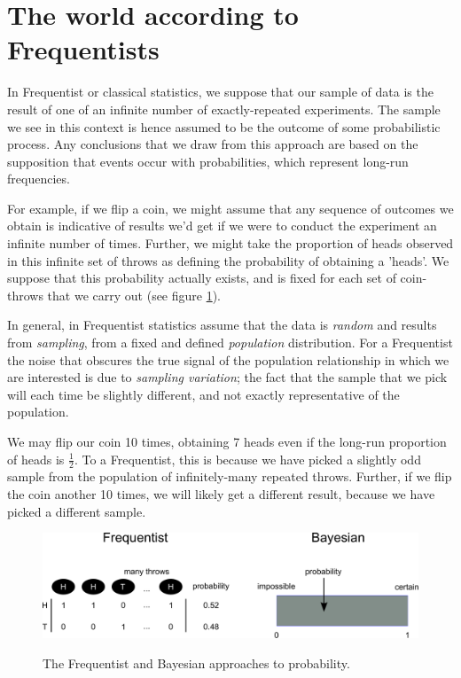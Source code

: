 \documentclass[11pt,fullpage]{book}
\begin{document}
\section{The world according to Frequentists}\label{sec:Intro_FrequentistsWorld}
In Frequentist or classical statistics, we suppose that our sample of data is the result of one of an infinite number of exactly-repeated experiments. The sample we see in this context is hence assumed to be the outcome of some probabilistic process. Any conclusions that we draw from this approach are based on the supposition that events occur with probabilities, which represent long-run frequencies. 

For example, if we flip a coin, we might assume that any sequence of outcomes we obtain is indicative of results we'd get if we were to conduct the experiment an infinite number of times. Further, we might take the proportion of heads observed in this infinite set of throws as defining the probability of obtaining a 'heads'. We suppose that this probability actually exists, and is fixed for each set of coin-throws that we carry out (see figure \ref{fig:Intro_FrequentistBayesProbability}).

In general, in Frequentist statistics assume that the data is \textit{random} and results from \textit{sampling}, from a fixed and defined \textit{population} distribution. For a Frequentist the noise that obscures the true signal of the population relationship in which we are interested is due to \textit{sampling variation}; the fact that the sample that we pick will each time be slightly different, and not exactly representative of the population. 

We may flip our coin 10 times, obtaining 7 heads even if the long-run proportion of heads is $\frac{1}{2}$. To a Frequentist, this is because we have picked a slightly odd sample from the population of infinitely-many repeated throws. Further, if we flip the coin another 10 times, we will likely get a different result, because we have picked a different sample.

\begin{figure}
\centering
\scalebox{0.3} 
{\includegraphics{Intro_FrequentistBayesProbability.pdf}}
\caption{The Frequentist and Bayesian approaches to probability.}\label{fig:Intro_FrequentistBayesProbability}
\end{figure}
\end{document}
